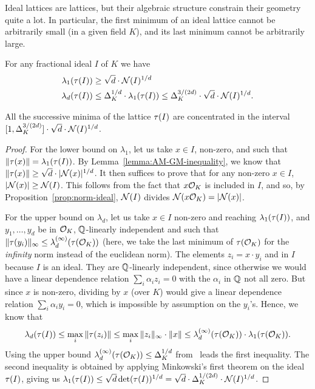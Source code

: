 Ideal lattices are lattices, but their algebraic structure constrain their geometry quite a lot. In particular, the first minimum of an ideal lattice cannot be arbitrarily small (in a given field $K$), and its last minimum cannot be arbitrarily large.

\begin{lemma}
\label{lemma:lower-upper-bounds-ideal-lambda_i}
For any fractional ideal $I$ of $K$ we have
\begin{align*}
\lambda_1(\tau(I)) &\geq \sqrt{d} \cdot \mathcal{N}(I)^{1/d} \\
\lambda_d(\tau(I)) & \leq \Delta_K^{1/d} \cdot \lambda_1(\tau(I)) \leq \Delta_K^{3/(2d)} \cdot \sqrt{d} \cdot \mathcal{N}(I)^{1/d}.
\end{align*}
\end{lemma}
All the successive minima of the lattice $\tau(I)$ are concentrated in the interval $[1, \Delta_K^{3/(2d)}] \cdot \sqrt{d} \cdot \mathcal{N}(I)^{1/d}$.

\begin{proof}
For the lower bound on $\lambda_1$, let us take $x \in I$, non-zero, and such that $\|\tau(x)\| = \lambda_1(\tau(I))$. By Lemma~\ref{lemma:AM-GM-inequality}, we know that $\|\tau(x)\| \geq \sqrt{d} \cdot |\mathcal{N}(x)|^{1/d}$. It then suffices to prove that for any non-zero $x \in I$, $|\mathcal{N}(x)| \geq \mathcal{N}(I)$. This follows from the fact that $x \mathcal{O}_K$ is included in $I$, and so, by Proposition~\ref{prop:norm-ideal}, $\mathcal{N}(I)$ divides $\mathcal{N}(x \mathcal{O}_K) = |\mathcal{N}(x)|$.

For the upper bound on $\lambda_d$, let us take $x \in I$ non-zero and reaching $\lambda_1(\tau(I))$, and $y_1, \dots, y_d$ be in $\mathcal{O}_K$, $\mathbb{Q}$-linearly independent and such that $\|\tau(y_i)\|_\infty \leq \lambda_d^{(\infty)}(\tau(\mathcal{O}_K))$ (here, we take the last minimum of $\tau(\mathcal{O}_K)$ for the \emph{infinity} norm instead of the euclidean norm). The elements $z_i = x \cdot y_i$ and in $I$ because $I$ is an ideal. They are $\mathbb{Q}$-linearly independent, since otherwise we would have a linear dependence relation $\sum_i \alpha_i z_i = 0$ with the $\alpha_i$ in $\mathbb{Q}$ not all zero. But since $x$ is non-zero, dividing by $x$ (over $K$) would give a linear dependence relation $\sum_i \alpha_i y_i = 0$, which is impossible by assumption on the $y_i$'s.
Hence, we know that 
\[\lambda_d(\tau(I)) \leq \max_i \|\tau(z_i)\| \leq \max_i \|z_i\|_\infty \cdot \|x\| \leq \lambda_d^{(\infty)}(\tau(\mathcal{O}_K)) \cdot \lambda_1(\tau(\mathcal{O}_K)).\]
Using the upper bound $\lambda_d^{(\infty)}(\tau(\mathcal{O}_K)) \leq \Delta_K^{1/d}$ from~\cite[Theorem A.4]{KoenThesis} leads the first inequality. The second inequality is obtained by applying Minkowski's first theorem on the ideal $\tau(I)$, giving us $\lambda_1(\tau(I)) \leq \sqrt{d} \det(\tau(I))^{1/d} = \sqrt{d} \cdot \Delta_K^{1/(2d)} \cdot \mathcal{N}(I)^{1/d}$.
\end{proof}


